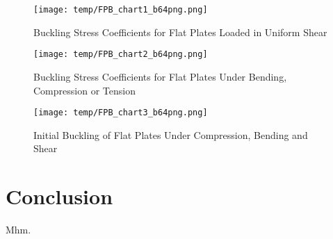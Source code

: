 \documentclass[11pt]{article}
\begin{document}
\begin{table}[h]
    \centering
	\caption{Output data}
	\label{tab:FPB2}
\end{table}

\begin{figure}[h]
\label{fig:FPB1}
\texttt{[image: temp/FPB\_chart1\_b64png.png]}
\caption{Buckling Stress Coefficients for Flat Plates Loaded in Uniform Shear}
\end{figure}

\begin{figure}[h]
\label{fig:FPB2}
\texttt{[image: temp/FPB\_chart2\_b64png.png]}
\caption{Buckling Stress Coefficients for Flat Plates Under Bending, Compression or Tension}
\end{figure}

\begin{figure}[h]
\label{fig:FPB3}
\texttt{[image: temp/FPB\_chart3\_b64png.png]}
\caption{Initial Buckling of Flat Plates Under Compression, Bending and Shear}
\end{figure}

\clearpage
\section{Conclusion}

Mhm.
\end{document}
